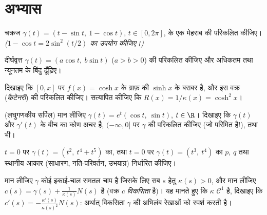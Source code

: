 \section{अभ्यास}

\begin{exercise}[$\star$]\label{exo:b2:curves:1}
चक्रज $\gamma(t) = (t -
\sin t,\ 1 - \cos t)$, $t \in [0, 2\pi]$, के एक मेहराब की  परिकलित कीजिए। \emph{($1 - \cos t =
2\sin^2(t/2)$ का उपयोग कीजिए।)}
\end{exercise}

\begin{exercise}[$\star$]\label{exo:b2:curves:2}
दीर्घवृत्त $\gamma(t) = (a\cos t,\ b\sin
t)$ ($a > b > 0$) की  परिकलित कीजिए और अधिकतम तथा न्यूनतम
 के बिंदु ढूँढ़िए।
\end{exercise}

\begin{exercise}[$\star$]\label{exo:b2:curves:3}
दिखाइए कि $[0, x]$ पर $f(x) = \cosh x$ के ग्राफ़ की 
$\sinh x$ के बराबर है, और इस वक्र (\emph{कैटेनरी}) की 
परिकलित कीजिए। सत्यापित कीजिए कि $R(x) = 1/\kappa(x) =
\cosh^2 x$।
\end{exercise}

\begin{exercise}[$\star\star$]\label{exo:b2:curves:4}
(लघुगणकीय सर्पिल) मान लीजिए $\gamma(t) = e^{t}(\cos t,\ \sin t)$, $t
\in \R$।
दिखाइए कि $\gamma(t)$ और $\gamma'(t)$ के बीच का कोण अचर है, $(-\infty, 0]$ पर
$\gamma$ की  परिकलित कीजिए (जो परिमित है!), तथा  भी।
\end{exercise}

\begin{exercise}[$\star\star$]\label{exo:b2:curves:5}
$t = 0$ पर $\gamma(t) = (t^2,\ t^4 + t^5)$ का, तथा $t = 0$ पर $\gamma(t) = (t^3,\ t^4)$ का $p$, $q$
तथा स्थानीय आकार (साधारण, नति-परिवर्तन, उभयाग्र) निर्धारित कीजिए।
\end{exercise}

\begin{exercise}[$\star\star$]\label{exo:b2:curves:6}
मान लीजिए $\gamma$ कोई इकाई-चाल समतल चाप है जिसके लिए सब $s$ हेतु
$\kappa(s) > 0$, और मान लीजिए $c(s) = \gamma(s) + \frac{1}{\kappa(s)}N(s)$  है
(वक्र $c$ \emph{विकसिता} है)। यह मानते हुए कि $\kappa$ $\mathcal{C}^1$ है,
दिखाइए कि $c'(s) =
-\frac{\kappa'(s)}{\kappa(s)^2}N(s)$: अर्थात् विकसिता $\gamma$ की अभिलंब रेखाओं को स्पर्श
करती है।
\end{exercise}

